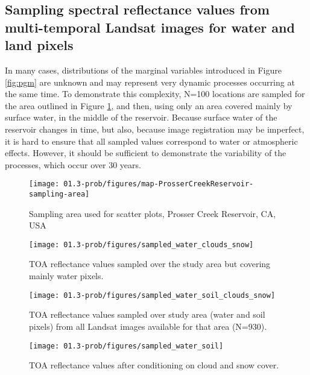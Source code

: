 \subsection{Sampling spectral reflectance values from multi-temporal Landsat images for water and land pixels}

In many cases, distributions of the marginal variables introduced in Figure \ref{fig:pgm} are unknown and may represent very dynamic processes occurring at the same time. To demonstrate this complexity, N=100 locations are sampled for the area outlined in Figure \ref{fig:study-area-PC}, and then, using only an area covered mainly by surface water, in the middle of the reservoir. Because surface water of the reservoir changes in time, but also, because image registration may be imperfect, it is hard to ensure that all sampled values correspond to water or atmospheric effects. However, it should be sufficient to demonstrate the variability of the processes, which occur over 30 years.

\begin{figure}[H]
	\centering
	\texttt{[image: 01.3-prob/figures/map-ProsserCreekReservoir-sampling-area]}
	\caption{Sampling area used for scatter plots, Prosser Creek Reservoir, CA, USA}
	\label{fig:study-area-PC}
\end{figure}

\begin{figure}[H]
	\texttt{[image: 01.3-prob/figures/sampled\_water\_clouds\_snow]}
	\caption{TOA reflectance values sampled over the study area but covering mainly water pixels.}
	\label{fig:prob-sampled-water-cloud-snow}
\end{figure}

\begin{figure}[H]
	\texttt{[image: 01.3-prob/figures/sampled\_water\_soil\_clouds\_snow]}
	\caption{TOA reflectance values sampled over study area (water and soil pixels) from all Landsat images available for that area (N=930).}
	\label{fig:prob-sampled-water-soil-cloud-snow}
\end{figure}

\begin{figure}[H]
	\texttt{[image: 01.3-prob/figures/sampled\_water\_soil]}
	\caption{TOA reflectance values after conditioning on cloud and snow cover.}
	\label{fig:prob-sampled-water-soil}
\end{figure}


